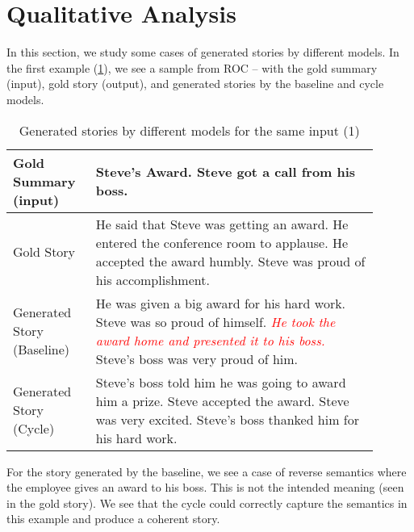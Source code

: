 


\section{Qualitative Analysis}

In this section, we study some cases of generated stories by different models. In the first example (\cref{tab:comp-sample-1}), we see a sample from ROC -- with the gold summary (input), gold story (output), and generated stories by the baseline and cycle models.

\begin{table}[h]
\centering
\begin{tabular}{p{0.2\linewidth} | p{0.7\linewidth}}
Gold Summary (input)  & Steve's Award. Steve got a call from his boss. \\ \hline
Gold Story & He said that Steve was getting an award. He entered the conference room to applause. He accepted the award humbly. Steve was proud of his accomplishment. \\ \hline
Generated Story (Baseline) & He was given a big award for his hard work. Steve was so proud of himself. \textcolor{red}{\textit{He took the award home and presented it to his boss.}} Steve's boss was very proud of him. \\ \hline
Generated Story (Cycle) & Steve's boss told him he was going to award him a prize. Steve accepted the award. Steve was very excited. Steve's boss thanked him for his hard work.
\end{tabular}
\caption{Generated stories by different models for the same input (1)}
\label{tab:comp-sample-1}
\end{table}

For the story generated by the baseline, we see a case of reverse semantics where the employee gives an award to his boss. This is not the intended meaning (seen in the gold story). We see that the cycle could correctly capture the semantics in this example and produce a coherent story.

